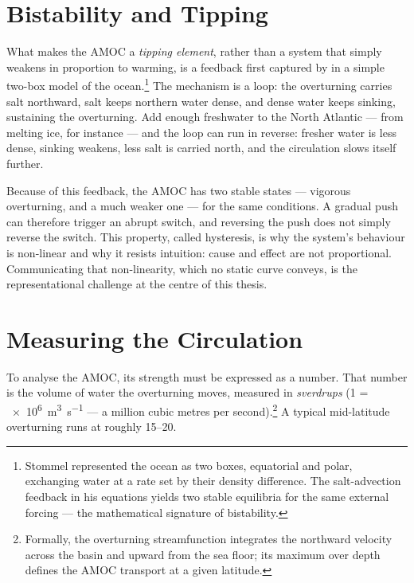 \section{Bistability and Tipping}
\label{sec:bg-bistability}

What makes the AMOC a \emph{tipping element}, rather than a system that simply weakens in proportion to warming, is a feedback first captured by \citet{stommel1961} in a simple two-box model of the ocean.\footnote{Stommel represented the ocean as two boxes, equatorial and polar, exchanging water at a rate set by their density difference. The salt-advection feedback in his equations yields two stable equilibria for the same external forcing --- the mathematical signature of bistability.} The mechanism is a loop: the overturning carries salt northward, salt keeps northern water dense, and dense water keeps sinking, sustaining the overturning. Add enough freshwater to the North Atlantic --- from melting ice, for instance --- and the loop can run in reverse: fresher water is less dense, sinking weakens, less salt is carried north, and the circulation slows itself further.

Because of this feedback, the AMOC has two stable states --- vigorous overturning, and a much weaker one --- for the same conditions. A gradual push can therefore trigger an abrupt switch, and reversing the push does not simply reverse the switch.%
This property, called hysteresis, is why the system's behaviour is non-linear and why it resists intuition: cause and effect are not proportional. Communicating that non-linearity, which no static curve conveys, is the representational challenge at the centre of this thesis.

\section{Measuring the Circulation}
\label{sec:bg-measurement}

To analyse the AMOC, its strength must be expressed as a number. That number is the volume of water the overturning moves, measured in \emph{sverdrups} (\SI{1}{\sverdrup} = \SI{e6}{\cubic\metre\per\second} --- a million cubic metres per second).\footnote{Formally, the overturning streamfunction integrates the northward velocity across the basin and upward from the sea floor; its maximum over depth defines the AMOC transport at a given latitude.} A typical mid-latitude overturning runs at roughly \SIrange{15}{20}{\sverdrup}.

